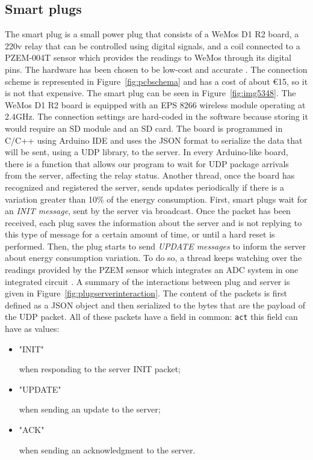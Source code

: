 \documentclass[conference]{IEEEtran}
\begin{document}
	\subsection{Smart plugs}\label{SP}
	The smart plug is a small power plug that consists of a WeMos D1 R2 board, a 220v relay that can be controlled using digital signals, and a coil connected to a PZEM-004T sensor \cite{8442052} \cite{8250475}  which provides the readings to WeMos through its digital pins. The hardware has been chosen to be low-cost and accurate \cite{8442066}.
	The connection scheme is represented in Figure~\ref{fig:pcbschema} and has a cost of about €15, so it is not that expensive. The smart plug can be seen in Figure~\ref{fig:img5348}.
	The WeMos D1 R2 board is equipped with an EPS 8266 wireless module operating at 2.4GHz. The connection settings are hard-coded in the software because storing it would require an SD module and an SD card. The board is programmed in C/C++ using Arduino IDE and uses the JSON format to serialize the data that will be sent, using a UDP library, to the server.
	In every Arduino-like board, there is a function that allows our program to wait for UDP package arrivals from the server, affecting the relay status.
	Another thread, once the board has recognized and registered the server, sends updates periodically if there is a variation greater than 10\% of the energy consumption.
	First, smart plugs wait for an \textit{INIT message}, sent by the server via broadcast. Once the packet has been received, each plug saves the information about the server and is not replying to this type of message for a certain amount of time, or until a hard reset is performed. 
	Then, the plug starts to send \textit{UPDATE messages} to inform the server about energy consumption variation. To do so, a thread keeps watching over the readings provided by the PZEM sensor which integrates an ADC  system  in one integrated circuit \cite{8612412}.
	A summary of the interactions between plug and server is given in Figure~\ref{fig:plugserverinteraction}.
	The content of the packets is first defined as a JSON object and then serialized to the bytes that are the payload of the UDP packet. All of these packets have a field in common: \verb|act| this field can have as values:
	\begin{itemize}
		\item \begin{spverbatim}"INIT"\end{spverbatim} when responding to the server INIT packet;
		\item \begin{spverbatim}"UPDATE"\end{spverbatim} when sending an update to the server;
		\item \begin{spverbatim}"ACK"\end{spverbatim} when sending an acknowledgment to the server.
	\end{itemize}
\end{document}
